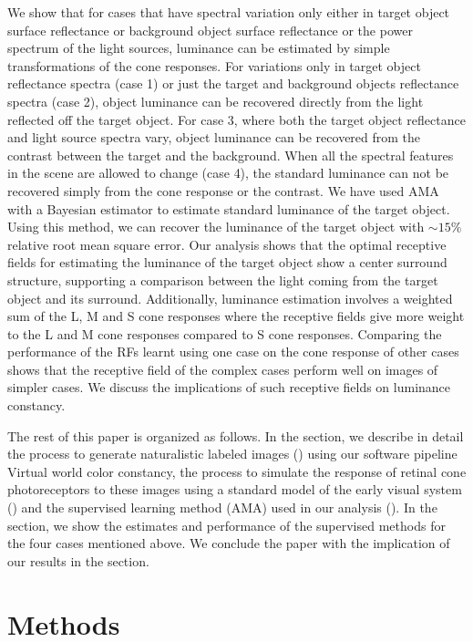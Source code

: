\documentclass{jov}
\begin{document}
We show that for cases that have spectral variation only either in target object surface reflectance or background object surface reflectance or the power spectrum of the light sources, luminance can be estimated by simple transformations of the cone responses. For variations only in target object reflectance spectra (case 1) or just the target and background objects reflectance spectra (case 2), object luminance can be recovered directly from the light reflected off the target object. For case 3, where both the target object reflectance and light source spectra vary, object luminance can be recovered from the contrast between the target and the background. When all the spectral features in the scene are allowed to change (case 4), the standard luminance can not be recovered simply from the cone response or the contrast. We have used AMA with a Bayesian estimator to estimate standard luminance of the target object. Using this method, we can recover the luminance of the target object with $\sim 15\%$ relative root mean square error.  Our analysis shows that the optimal receptive fields for estimating the luminance of the target object show a center surround structure, supporting a comparison between the light coming from the target object and its surround. Additionally, luminance estimation involves a weighted sum of the L, M and S cone responses where the receptive fields give more weight to the L and M cone responses compared to S cone responses. Comparing the performance of the RFs learnt using  one case on the cone response of other cases shows that the receptive field of the complex cases perform well on images of simpler cases. We discuss the implications of such receptive fields on luminance constancy. 

The rest of this paper is organized as follows. In the  section, we describe in detail the process to generate naturalistic labeled images () using our software pipeline {\rm Virtual world color constancy}, the process to simulate the response of retinal cone photoreceptors to these images using a standard model of the early visual system () and the supervised learning method (AMA) used in our analysis (). In the  section, we show the estimates and performance of the supervised methods for the four cases mentioned above. We conclude the paper with the implication of our results in the  section.  

\section*{Methods} \label{Methods}
\end{document}
